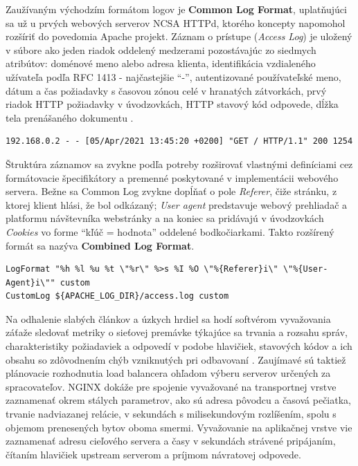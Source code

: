 \documentclass[12pt, a4paper]{article}
\begin{document}
Zaužívaným východzím formátom logov je \textbf{Common Log Format}, uplatňujúci sa už u prvých webových 
serverov NCSA HTTPd, ktorého koncepty napomohol rozšíriť do povedomia Apache projekt. Záznam o prístupe
(\emph{Access Log}) je uložený v súbore ako jeden riadok oddelený medzerami pozostávajúc zo siedmych
atribútov: doménové meno alebo adresa klienta, identifikácia vzdialeného užívateľa podľa
RFC 1413 - najčastejšie \enquote{-}, autentizované používateľské meno, dátum a čas požiadavky s časovou zónou 
celé v hranatých zátvorkách, prvý riadok HTTP požiadavky v úvodzovkách, HTTP stavový kód odpovede, dĺžka tela 
prenášaného dokumentu \cite{common-log}.
\begin{lstlisting}[caption=Ukážka záznamu v Common Log Format]
192.168.0.2 - - [05/Apr/2021 13:45:20 +0200] "GET / HTTP/1.1" 200 1254
\end{lstlisting}

Štruktúra záznamov sa zvykne podľa potreby rozširovať vlastnými definíciami cez formátovacie špecifikátory
a premenné poskytované v implementácii webového servera. Bežne sa Common Log zvykne dopĺňať o pole 
\emph{Referer}, čiže stránku, z ktorej klient hlási, že bol odkázaný; \emph{User agent} predstavuje webový 
prehliadač a platformu návštevníka webstránky a na koniec sa pridávajú v úvodzovkách \emph{Cookies} vo forme 
\enquote{kľúč = hodnota} oddelené bodkočiarkami. Takto rozšírený formát sa nazýva 
\textbf{Combined Log Format}.

\begin{lstlisting}[caption=Vlastný formát pre access log na webovom serveri Apache, 
basicstyle=\ttfamily\scriptsize]
LogFormat "%h %l %u %t \"%r\" %>s %I %O \"%{Referer}i\" \"%{User-Agent}i\"" custom
CustomLog ${APACHE_LOG_DIR}/access.log custom
\end{lstlisting}

Na odhalenie slabých článkov a úzkych hrdiel sa hodí softvérom vyvažovania záťaže sledovať
metriky o sieťovej premávke týkajúce sa trvania a rozsahu správ, charakteristiky požiadaviek
a odpovedí v podobe hlavičiek, stavových kódov a ich obsahu so zdôvodnením chýb vzniknutých pri
odbavovaní \cite{haproxy-logging}. Zaujímavé sú taktiež plánovacie rozhodnutia load balancera ohľadom
výberu serverov určených za spracovateľov. NGINX dokáže pre spojenie vyvažované na transportnej
vrstve zaznamenať okrem stálych parametrov, ako sú adresa pôvodcu a časová pečiatka, trvanie
nadviazanej relácie, v sekundách s milisekundovým rozlíšením, spolu s objemom prenesených bytov 
oboma smermi. Vyvažovanie na aplikačnej vrstve vie zaznamenať adresu cieľového servera a časy
v sekundách strávené pripájaním, čítaním hlavičiek upstream serverom a príjmom návratovej odpovede.
\end{document}
